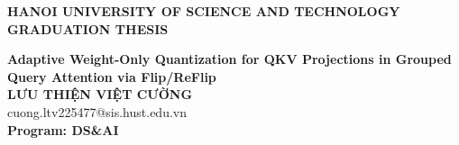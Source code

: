 \documentclass[main.tex]{subfiles}
\begin{document}
\begin{titlepage}
\thispagestyle{empty}

\begin{center}

{\textbf{\large{HANOI UNIVERSITY OF SCIENCE AND TECHNOLOGY }}}\\[4cm]

{\textbf{\huge{GRADUATION THESIS}}}\\[1cm]
{\textbf{\Large{Adaptive Weight-Only Quantization for QKV Projections in Grouped Query Attention via Flip/ReFlip}}\\[1cm]

{\textbf{\large{LƯU THIỆN VIỆT CƯỜNG}}}\\
{\large{cuong.ltv225477@sis.hust.edu.vn}}\\[0.5cm]

{\textbf{\large{Program: DS\&AI}}}\\

\vspace{4cm}

\begin{table}[H]
\centering
{}
\end{table}}
\end{center}

\end{titlepage}
\end{document}

